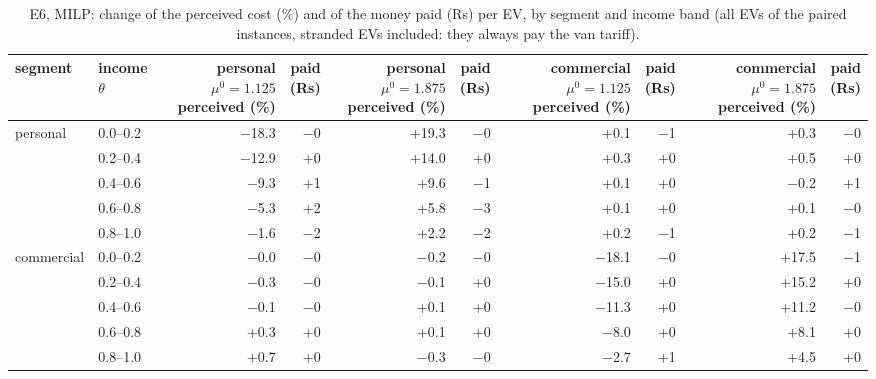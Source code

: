 \begin{table}[H]\centering
\scriptsize
\caption{E6, MILP: change of the perceived cost (\%) and of the money paid (Rs) per EV, by segment and income band (all EVs of the paired instances, stranded EVs included: they always pay the van tariff).}\label{tab:eqE6}
\begin{adjustbox}{max width=\textwidth}\begin{tabular}{llrrrrrrrr}\toprule
segment & income $\theta$ & \shortstack{personal $\mu^{0}=1.125$\\perceived (\%)} & \shortstack{paid\\(Rs)} & \shortstack{personal $\mu^{0}=1.875$\\perceived (\%)} & \shortstack{paid\\(Rs)} & \shortstack{commercial $\mu^{0}=1.125$\\perceived (\%)} & \shortstack{paid\\(Rs)} & \shortstack{commercial $\mu^{0}=1.875$\\perceived (\%)} & \shortstack{paid\\(Rs)} \\ \midrule
personal & 0.0--0.2 & $-$18.3 & $-$0 & +19.3 & $-$0 & +0.1 & $-$1 & +0.3 & $-$0 \\
 & 0.2--0.4 & $-$12.9 & +0 & +14.0 & +0 & +0.3 & +0 & +0.5 & +0 \\
 & 0.4--0.6 & $-$9.3 & +1 & +9.6 & $-$1 & +0.1 & +0 & $-$0.2 & +1 \\
 & 0.6--0.8 & $-$5.3 & +2 & +5.8 & $-$3 & +0.1 & +0 & +0.1 & $-$0 \\
 & 0.8--1.0 & $-$1.6 & $-$2 & +2.2 & $-$2 & +0.2 & $-$1 & +0.2 & $-$1 \\
commercial & 0.0--0.2 & $-$0.0 & $-$0 & $-$0.2 & $-$0 & $-$18.1 & $-$0 & +17.5 & $-$1 \\
 & 0.2--0.4 & $-$0.3 & $-$0 & $-$0.1 & +0 & $-$15.0 & +0 & +15.2 & +0 \\
 & 0.4--0.6 & $-$0.1 & $-$0 & +0.1 & +0 & $-$11.3 & +0 & +11.2 & $-$0 \\
 & 0.6--0.8 & +0.3 & +0 & +0.1 & +0 & $-$8.0 & +0 & +8.1 & +0 \\
 & 0.8--1.0 & +0.7 & +0 & $-$0.3 & $-$0 & $-$2.7 & +1 & +4.5 & +0 \\
\bottomrule\end{tabular}\end{adjustbox}\end{table}

